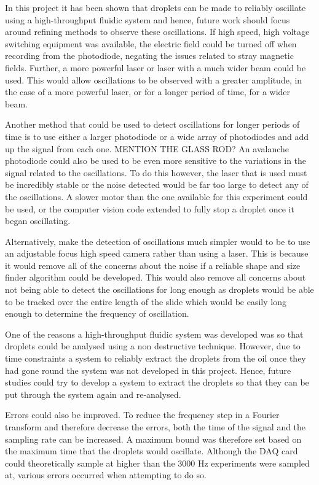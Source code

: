 \documentclass{physics_article_B}
\begin{document}
    In this project it has been shown that droplets can be made to reliably oscillate using a high-throughput fluidic system and hence, future work should focus around refining methods to observe these oscillations. If high speed, high voltage switching equipment was available, the electric field could be turned off when recording from the photodiode, negating the issues related to stray magnetic fields. Further, a more powerful laser or laser with a much wider beam could be used. This would allow oscillations to be observed with a greater amplitude, in the case of a more powerful laser, or for a longer period of time, for a wider beam. 
    
    Another method that could be used to detect oscillations for longer periods of time is to use either a larger photodiode or a wide array of photodiodes and add up the signal from each one. MENTION THE GLASS ROD? An avalanche photodiode could also be used to be even more sensitive to the variations in the signal related to the oscillations. To do this however, the laser that is used must be incredibly stable or the noise detected would be far too large to detect any of the oscillations. A slower motor than the one available for this experiment could be used, or the computer vision code extended to fully stop a droplet once it began oscillating.
    
    Alternatively, make the detection of oscillations much simpler would to be to use an adjustable focus high speed camera rather than using a laser. This is because it would remove all of the concerns about the noise if a reliable shape and size finder algorithm could be developed. This would also remove all concerns about not being able to detect the oscillations for long enough as droplets would be able to be tracked over the entire length of the slide which would be easily long enough to determine the frequency of oscillation. 
    
    One of the reasons a high-throughput fluidic system was developed was so that droplets could be analysed using a non destructive technique. However, due to time constraints a system to reliably extract the droplets from the oil once they had gone round the system was not developed in this project. Hence, future studies could try to develop a system to extract the droplets so that they can be put through the system again and re-analysed.
    
    Errors could also be improved. To reduce the frequency step in a Fourier transform and therefore decrease the errors, both the time of the signal and the sampling rate can be increased. A maximum bound was therefore set based on the maximum time that the droplets would oscillate. Although the DAQ card could theoretically sample at higher than the 3000 Hz experiments were sampled at, various errors occurred when attempting to do so.
    
\end{document}
